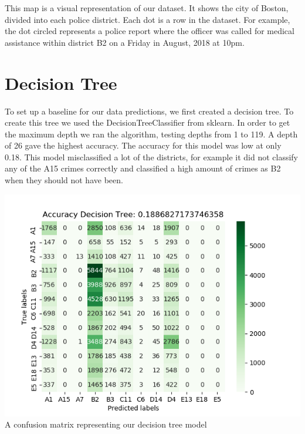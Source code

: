 \documentclass[a0,landscape]{a0poster}
\let\Section=\section
\def\section{\setcounter{equation}{0}\Section}
\newcommand{\1}{\bold{1}}
\begin{document}
\begin{multicols}{3}
\begin{center}
    This map is a visual representation of our dataset. It shows the city of Boston, divided into each police district. Each dot is a row in the dataset. For example, the dot circled represents a police report where the officer was called for medical assistance within district B2 on a Friday in August, 2018 at 10pm. 
\end{center}
\section{Decision Tree}
To set up a baseline for our data predictions, we first created a decision tree. To create this tree we used the DecisionTreeClassifier from sklearn. In order to get the maximum depth we ran the algorithm, testing depths from 1 to 119. A depth of 26 gave the highest accuracy. The accuracy for this model was low at only 0.18. This model misclassified a lot of the districts, for example it did not classify any of the A15 crimes correctly and classified a high amount of crimes as B2 when they should not have been.

\begin{center}
    \includegraphics[scale = 2]{decision_tree_cm.png} \\
    A confusion matrix representing our decision tree model
\end{center}


\end{multicols}
\end{document}
